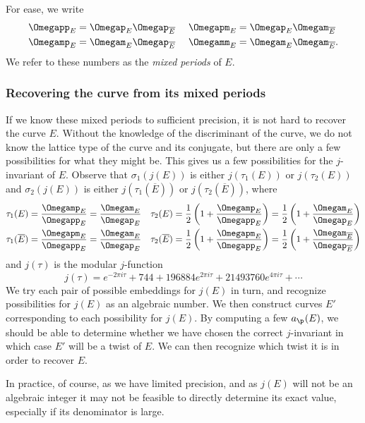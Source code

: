 \documentclass{amsart}
\newcommand{\ap}[1]{a_{\p_{#1}}}
\newcommand{\Ebar}{\overline{E}}
\begin{document}
For ease, we write
\begin{align*}
\Omegapp_E &= \Omegap_E\Omegap_{\Ebar}& \ \Omegapm_E &= \Omegap_E\Omegam_{\Ebar} \\
\Omegamp_E &= \Omegam_E\Omegap_{\Ebar}& \ \Omegamm_E &= \Omegam_E\Omegam_{\Ebar}.
\end{align*}
We refer to these numbers as the {\em mixed periods} of $E$.

\subsubsection{Recovering the curve from its mixed periods}
If we know these mixed periods to sufficient precision, it is not hard
to recover the curve $E$. Without the knowledge of the discriminant
of the curve, we do not know the lattice type of the curve and its
conjugate, but there are only a few possibilities for what they might
be. This gives us a few possibilities for the $j$-invariant of
$E$. Observe that $\sigma_1(j(E))$ is either $j(\tau_1(E))$ or $j(\tau_2(E))$
and $\sigma_2(j(E))$ is either $j(\tau_1(\Ebar))$ or $j(\tau_2(\Ebar))$,
where
\begin{align*}
    \tau_1(E) &= \frac{\Omegamp_E}{\Omegapp_E} = \frac{\Omegam_E}{\Omegap_E}&  \tau_2(E) &= \frac{1}{2}\left(1 + \frac{\Omegamp_E}{\Omegapp_E}\right) = \frac{1}{2}\left(1 + \frac{\Omegam_E}{\Omegap_E}\right) \\
    \tau_1(\Ebar) &= \frac{\Omegapm_E}{\Omegapp_E} = \frac{\Omegam_E}{\Omegap_E} &    \tau_2(\Ebar) &= \frac{1}{2}\left(1 + \frac{\Omegapm_E}{\Omegapp_E}\right) = \frac{1}{2}\left(1 + \frac{\Omegam_{\Ebar}}{\Omegap_{\Ebar}}\right)
\end{align*}
and $j(\tau)$ is the modular $j$-function
\[
    j(\tau) = e^{-2\pi i \tau} + 744 + 196884e^{2\pi i \tau} + 21493760e^{4\pi i \tau} + \cdots
\]
We try each pair of possible embeddings for $j(E)$ in turn, and recognize
possibilities for $j(E)$ as an algebraic number. We then construct curves $E'$
corresponding to each possibility for $j(E)$. By computing a few $\ap{}(E)$, we
should be able to determine whether we have chosen the correct $j$-invariant
in which case $E'$ will be a twist of $E$. We can then recognize which twist it is
in order to recover $E$.

In practice, of course, as we have limited precision, and as $j(E)$ will not be
an algebraic integer it may not be feasible to directly determine its exact value,
especially if its denominator is large.
\end{document}

